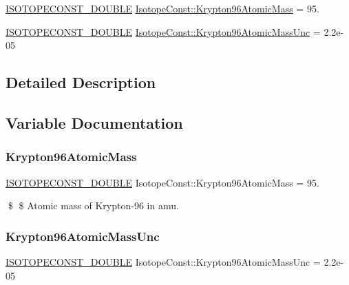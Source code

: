 \begin{DoxyCompactItemize}
\item 
\mbox{\hyperlink{group___isotope_const-_macros_ga8f45a7272ce02c0b4c65c44636ed719a}{I\+S\+O\+T\+O\+P\+E\+C\+O\+N\+S\+T\+\_\+\+D\+O\+U\+B\+LE}} \mbox{\hyperlink{group___isotope_const-_krypton-_kr96_ga3e924c8649adb193ae6198f20360b7b2}{Isotope\+Const\+::\+Krypton96\+Atomic\+Mass}} = 95.
\item 
\mbox{\hyperlink{group___isotope_const-_macros_ga8f45a7272ce02c0b4c65c44636ed719a}{I\+S\+O\+T\+O\+P\+E\+C\+O\+N\+S\+T\+\_\+\+D\+O\+U\+B\+LE}} \mbox{\hyperlink{group___isotope_const-_krypton-_kr96_ga35bf3dc75cde43b0ab281505ea2d3cc6}{Isotope\+Const\+::\+Krypton96\+Atomic\+Mass\+Unc}} = 2.\+2e-\/05
\end{DoxyCompactItemize}


\subsection{Detailed Description}


\subsection{Variable Documentation}
\mbox{\label{group___isotope_const-_krypton-_kr96_ga3e924c8649adb193ae6198f20360b7b2}} 
\subsubsection{\texorpdfstring{Krypton96\+Atomic\+Mass}{Krypton96AtomicMass}}
{\footnotesize\ttfamily \mbox{\hyperlink{group___isotope_const-_macros_ga8f45a7272ce02c0b4c65c44636ed719a}{I\+S\+O\+T\+O\+P\+E\+C\+O\+N\+S\+T\+\_\+\+D\+O\+U\+B\+LE}} Isotope\+Const\+::\+Krypton96\+Atomic\+Mass = 95.}

\$ \$ Atomic mass of Krypton-\/96 in amu. \mbox{\label{group___isotope_const-_krypton-_kr96_ga35bf3dc75cde43b0ab281505ea2d3cc6}} 
\subsubsection{\texorpdfstring{Krypton96\+Atomic\+Mass\+Unc}{Krypton96AtomicMassUnc}}
{\footnotesize\ttfamily \mbox{\hyperlink{group___isotope_const-_macros_ga8f45a7272ce02c0b4c65c44636ed719a}{I\+S\+O\+T\+O\+P\+E\+C\+O\+N\+S\+T\+\_\+\+D\+O\+U\+B\+LE}} Isotope\+Const\+::\+Krypton96\+Atomic\+Mass\+Unc = 2.\+2e-\/05}

